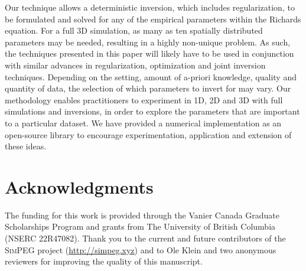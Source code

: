 \documentclass[preprint,review,3p,times,onecolumn,authoryear]{elsarticle}
\begin{document}
Our technique allows a deterministic inversion, which includes regularization, to be formulated and solved for any of the empirical parameters within the Richards equation. For a full 3D simulation, as many as ten spatially distributed parameters may be needed, resulting in a highly non-unique problem. As such, the techniques presented in this paper will likely have to be used in conjunction with similar advances in regularization, optimization and joint inversion techniques. Depending on the setting, amount of a-priori knowledge, quality and quantity of data, the selection of which parameters to invert for may vary. Our methodology enables practitioners to experiment in 1D, 2D and 3D with full simulations and inversions, in order to explore the parameters that are important to a particular dataset. We have provided a numerical implementation as an open-source library to encourage experimentation, application and extension of these ideas.

\section*{Acknowledgments}
The funding for this work is provided through the Vanier Canada Graduate Scholarships Program and grants from The University of British Columbia (NSERC 22R47082). Thank you to the current and future contributors of the \textsc{\textsc{SimPEG}} project (\url{http://simpeg.xyz}) and to Ole Klein and two anonymous reviewers for improving the quality of this manuscript.

\newpage



\end{document}
